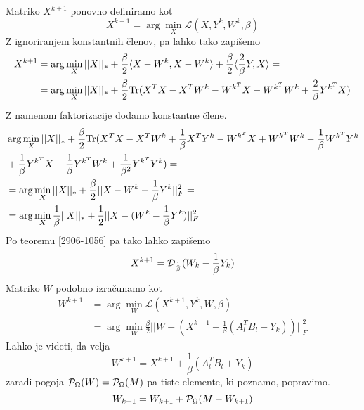 Matriko $X^{k+1}$ ponovno definiramo kot 
\[
  X^{k+1} = \arg \min_X \mathcal{L}(X, Y^k, W^k, \beta)  
\]
Z ignoriranjem konstantnih členov, pa lahko tako zapišemo
\begin{align*}
  X^{k+1} &= \arg \min_X ||X||_* + \frac{\beta}{2}\langle X-W^k, X-W^k \rangle + \frac{\beta}{2}\langle \frac{2}{\beta}Y, X \rangle = \\
  &= \arg \min_X ||X||_* + \frac{\beta}{2}\text{Tr}(X^TX - X^TW^k - W^{k^T}X - W^{k^T}W^k + \frac{2}{\beta}Y^{k^T}X )
\end{align*}
Z namenom faktorizacije dodamo konstantne člene.
\begin{align*}
    &\arg \min_X ||X||_* + \frac{\beta}{2}\text{Tr}(X^TX - X^TW^k + \frac{1}{\beta}X^TY^k - W^{k^T}X + W^{k^T}W^k - \frac{1}{\beta}W^{k^T}Y^k \\
    &+\frac{1}{\beta}Y^{k^T}X - \frac{1}{\beta}Y^{k^T}W^k + \frac{1}{\beta^2}Y^{k^T}Y^k) =\\ 
  &= \arg \min_X ||X||_* + \frac{\beta}{2} ||X-W^k + \frac{1}{\beta}Y^k||^2_F = \\
  &= \arg \min_X \frac{1}{\beta}||X||_* +  \frac{1}{2}||X-(W^k - \frac{1}{\beta}Y^k)||^2_F
\end{align*}
Po teoremu \ref{2906-1056} pa tako lahko zapišemo 
\[
    X^{k+1} = \mathcal{D}_\frac{1}{\beta}(W_k - \frac{1}{\beta} Y_k)
\]
Matriko $W$ podobno izračunamo kot 
\begin{align*}
    W^{k+1} &= \arg \min_{W} \mathcal{L}(X^{k+1}, Y^k, W, \beta) \\ 
    &= \arg \min_W \frac{\beta}{2} ||W - (X^{k+1} + \frac{1}{\beta}(A_l^T B_l + Y_k)) ||^2_F
\end{align*}
Lahko je videti, da velja
\[
    W^{k+1} = X^{k+1} + \frac{1}{\beta}(A_l^T B_l + Y_k)
\]
zaradi pogoja $\mathcal{P}_\Omega(W) = \mathcal{P}_\Omega(M)$ pa tiste elemente, ki poznamo, popravimo. \cite{TNNM-HZYLH12}
\begin{equation}
    \label{2906-1248}
    W_{k+1} = W_{k+1} + \mathcal{P}_\Omega(M - W_{k+1})
\end{equation}
